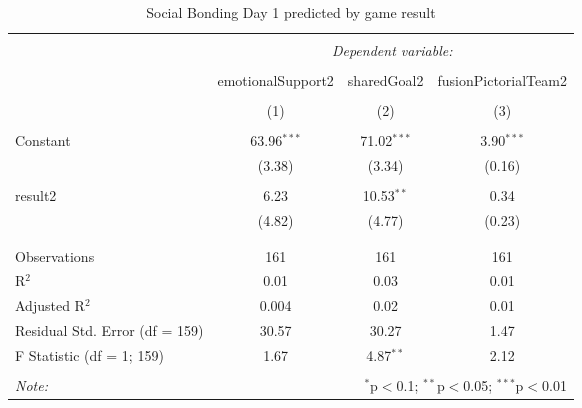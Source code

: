 
\begin{table}[!htbp] \centering 
  \caption{Social Bonding Day 1 predicted by game result} 
  \label{tab:socialBondingDay1Result} 
\footnotesize 
\begin{tabular}{@{\extracolsep{5pt}}lccc} 
\\[-1.8ex]\hline 
\hline \\[-1.8ex] 
 & \multicolumn{3}{c}{\textit{Dependent variable:}} \\ 
\cline{2-4} 
\\[-1.8ex] & emotionalSupport2 & sharedGoal2 & fusionPictorialTeam2 \\ 
\\[-1.8ex] & (1) & (2) & (3)\\ 
\hline \\[-1.8ex] 
 Constant & 63.96$^{***}$ & 71.02$^{***}$ & 3.90$^{***}$ \\ 
  & (3.38) & (3.34) & (0.16) \\ 
  & & & \\ 
 result2 & 6.23 & 10.53$^{**}$ & 0.34 \\ 
  & (4.82) & (4.77) & (0.23) \\ 
  & & & \\ 
\hline \\[-1.8ex] 
Observations & 161 & 161 & 161 \\ 
R$^{2}$ & 0.01 & 0.03 & 0.01 \\ 
Adjusted R$^{2}$ & 0.004 & 0.02 & 0.01 \\ 
Residual Std. Error (df = 159) & 30.57 & 30.27 & 1.47 \\ 
F Statistic (df = 1; 159) & 1.67 & 4.87$^{**}$ & 2.12 \\ 
\hline 
\hline \\[-1.8ex] 
\textit{Note:}  & \multicolumn{3}{r}{$^{*}$p$<$0.1; $^{**}$p$<$0.05; $^{***}$p$<$0.01} \\ 
\end{tabular} 
\end{table} 
